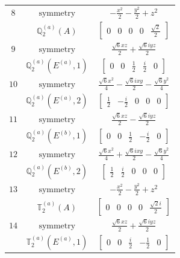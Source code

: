 \documentclass[fleqn,8pt,landscape]{jsarticle}
\begin{document}
\begin{longtable}{ccc}
$ 8 $ & $ \text{symmetry} $ & $ - \frac{x^{2}}{2} - \frac{y^{2}}{2} + z^{2} $ \\
$  $ & $ \mathbb{Q}_{2}^{(a)}(A) $ & $ \begin{bmatrix} 0 & 0 & 0 & 0 & \frac{\sqrt{2}}{2} \end{bmatrix} $ \\ \hline
$ 9 $ & $ \text{symmetry} $ & $ \frac{\sqrt{6} x z}{2} + \frac{\sqrt{6} i y z}{2} $ \\
$  $ & $ \mathbb{Q}_{2}^{(a)}(E^{(a)},1) $ & $ \begin{bmatrix} 0 & 0 & \frac{1}{2} & \frac{i}{2} & 0 \end{bmatrix} $ \\ \hline
$ 10 $ & $ \text{symmetry} $ & $ \frac{\sqrt{6} x^{2}}{4} - \frac{\sqrt{6} i x y}{2} - \frac{\sqrt{6} y^{2}}{4} $ \\
$  $ & $ \mathbb{Q}_{2}^{(a)}(E^{(a)},2) $ & $ \begin{bmatrix} \frac{1}{2} & - \frac{i}{2} & 0 & 0 & 0 \end{bmatrix} $ \\ \hline
$ 11 $ & $ \text{symmetry} $ & $ \frac{\sqrt{6} x z}{2} - \frac{\sqrt{6} i y z}{2} $ \\
$  $ & $ \mathbb{Q}_{2}^{(a)}(E^{(b)},1) $ & $ \begin{bmatrix} 0 & 0 & \frac{1}{2} & - \frac{i}{2} & 0 \end{bmatrix} $ \\ \hline
$ 12 $ & $ \text{symmetry} $ & $ \frac{\sqrt{6} x^{2}}{4} + \frac{\sqrt{6} i x y}{2} - \frac{\sqrt{6} y^{2}}{4} $ \\
$  $ & $ \mathbb{Q}_{2}^{(a)}(E^{(b)},2) $ & $ \begin{bmatrix} \frac{1}{2} & \frac{i}{2} & 0 & 0 & 0 \end{bmatrix} $ \\ \hline
$ 13 $ & $ \text{symmetry} $ & $ - \frac{x^{2}}{2} - \frac{y^{2}}{2} + z^{2} $ \\
$  $ & $ \mathbb{T}_{2}^{(a)}(A) $ & $ \begin{bmatrix} 0 & 0 & 0 & 0 & \frac{\sqrt{2} i}{2} \end{bmatrix} $ \\ \hline
$ 14 $ & $ \text{symmetry} $ & $ \frac{\sqrt{6} x z}{2} + \frac{\sqrt{6} i y z}{2} $ \\
$  $ & $ \mathbb{T}_{2}^{(a)}(E^{(a)},1) $ & $ \begin{bmatrix} 0 & 0 & \frac{i}{2} & - \frac{1}{2} & 0 \end{bmatrix} $ \\ \hline

\end{longtable}
\end{document}
